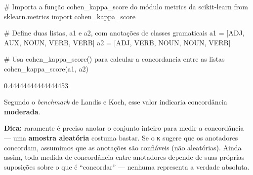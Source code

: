 \documentclass[
  brazilian,
  11pt,
]{article}
\newenvironment{Shaded}{\begin{snugshade}}{\end{snugshade}}
\newcommand{\CommentTok}[1]{\textcolor[rgb]{0.48,0.49,0.49}{#1}}
\newcommand{\ImportTok}[1]{\textcolor[rgb]{0.15,0.68,0.38}{#1}}
\newcommand{\NormalTok}[1]{\textcolor[rgb]{0.81,0.81,0.76}{#1}}
\newcommand{\OperatorTok}[1]{\textcolor[rgb]{0.81,0.81,0.76}{#1}}
\newcommand{\StringTok}[1]{\textcolor[rgb]{0.96,0.31,0.31}{#1}}
\begin{document}
\begin{Shaded}
\begin{Highlighting}[]
\CommentTok{\# Importa a função cohen\_kappa\_score do módulo \textquotesingle{}metrics\textquotesingle{} da scikit{-}learn}
\ImportTok{from}\NormalTok{ sklearn.metrics }\ImportTok{import}\NormalTok{ cohen\_kappa\_score}

\CommentTok{\# Define duas listas, \textquotesingle{}a1\textquotesingle{} e \textquotesingle{}a2\textquotesingle{}, com anotações de classes gramaticais}
\NormalTok{a1 }\OperatorTok{=}\NormalTok{ [}\StringTok{\textquotesingle{}ADJ\textquotesingle{}}\NormalTok{, }\StringTok{\textquotesingle{}AUX\textquotesingle{}}\NormalTok{, }\StringTok{\textquotesingle{}NOUN\textquotesingle{}}\NormalTok{, }\StringTok{\textquotesingle{}VERB\textquotesingle{}}\NormalTok{, }\StringTok{\textquotesingle{}VERB\textquotesingle{}}\NormalTok{]}
\NormalTok{a2 }\OperatorTok{=}\NormalTok{ [}\StringTok{\textquotesingle{}ADJ\textquotesingle{}}\NormalTok{, }\StringTok{\textquotesingle{}VERB\textquotesingle{}}\NormalTok{, }\StringTok{\textquotesingle{}NOUN\textquotesingle{}}\NormalTok{, }\StringTok{\textquotesingle{}NOUN\textquotesingle{}}\NormalTok{, }\StringTok{\textquotesingle{}VERB\textquotesingle{}}\NormalTok{]}

\CommentTok{\# Usa cohen\_kappa\_score() para calcular a concordancia entre as listas}
\NormalTok{cohen\_kappa\_score(a1, a2)}
\end{Highlighting}
\end{Shaded}

\begin{Shaded}
\begin{Highlighting}[]
\NormalTok{0.44444444444444453}
\end{Highlighting}
\end{Shaded}

Segundo o \emph{benchmark} de Landis e Koch, esse valor indicaria
concordância \textbf{moderada}.

\begin{tipbox}

\textbf{Dica:} raramente é preciso anotar o conjunto inteiro para medir
a concordância --- uma \textbf{amostra aleatória} costuma bastar. Se o κ
sugere que os anotadores concordam, assumimos que as anotações são
confiáveis (não aleatórias). Ainda assim, toda medida de concordância
entre anotadores depende de suas próprias suposições sobre o que é
``concordar'' --- nenhuma representa a verdade absoluta.

\end{tipbox}
\end{document}
